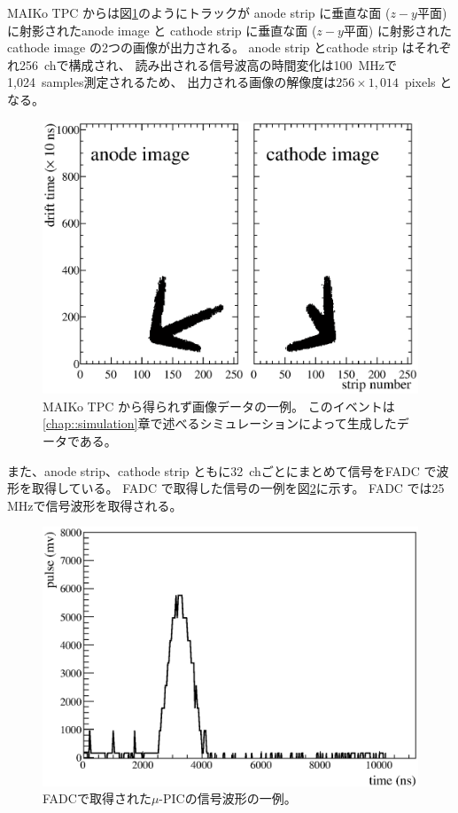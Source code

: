 \documentclass[../master]{subfiles}
\begin{document}
MAIKo TPC からは図\ref{fig::track_demo}のようにトラックが
anode strip に垂直な面 ($z-y$平面) に射影されたanode image と
cathode strip に垂直な面 ($z-y$平面) に射影されたcathode image の2つの画像が出力される。
anode strip とcathode strip はそれぞれ256~chで構成され、
読み出される信号波高の時間変化は100~MHzで1,024~samples測定されるため、
出力される画像の解像度は$256\times1,014$~pixels となる。
\begin{figure}
  \centering
  \includegraphics[clip, width=0.9\columnwidth]{10024_4.eps}
  \caption[MAIKo TPC から得られず画像データの一例。]
          {MAIKo TPC から得られず画像データの一例。
          このイベントは\ref{chap::simulation}章で述べるシミュレーションによって生成したデータである。}
  \label{fig::track_demo}
\end{figure}
また、anode strip、cathode strip ともに32~chごとにまとめて信号をFADC で波形を取得している。
FADC で取得した信号の一例を図\ref{fig::FADC_waveform}に示す。
FADC では25 MHzで信号波形を取得される。
\begin{figure}
  \centering
  \includegraphics[clip, width=0.7\columnwidth]{0101_waveform_8.eps}
  \caption{FADCで取得された$\mu$-PICの信号波形の一例。}
  \label{fig::FADC_waveform}
\end{figure}
\end{document}
